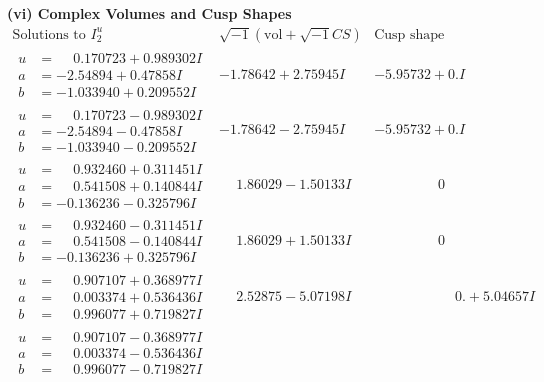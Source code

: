 \documentclass[1p]{elsarticle_modified}
\theoremstyle{definition}
\newcommand{\I}{\sqrt{-1}}
\begin{document}
\newpage\flushleft \textbf{(vi) Complex Volumes and Cusp Shapes}
$$\begin{array}{c|c|c}  
\text{Solutions to }I^u_{2}& \I (\text{vol} + \sqrt{-1}CS) & \text{Cusp shape}\\
 \hline 
\begin{aligned}
u &= \phantom{-}0.170723 + 0.989302 I \\
a &= -2.54894 + 0.47858 I \\
b &= -1.033940 + 0.209552 I\end{aligned}
 & -1.78642 + 2.75945 I & -5.95732 + 0. I\phantom{ +0.000000I} \\ \hline\begin{aligned}
u &= \phantom{-}0.170723 - 0.989302 I \\
a &= -2.54894 - 0.47858 I \\
b &= -1.033940 - 0.209552 I\end{aligned}
 & -1.78642 - 2.75945 I & -5.95732 + 0. I\phantom{ +0.000000I} \\ \hline\begin{aligned}
u &= \phantom{-}0.932460 + 0.311451 I \\
a &= \phantom{-}0.541508 + 0.140844 I \\
b &= -0.136236 - 0.325796 I\end{aligned}
 & \phantom{-}1.86029 - 1.50133 I & \phantom{-0.000000 } 0 \\ \hline\begin{aligned}
u &= \phantom{-}0.932460 - 0.311451 I \\
a &= \phantom{-}0.541508 - 0.140844 I \\
b &= -0.136236 + 0.325796 I\end{aligned}
 & \phantom{-}1.86029 + 1.50133 I & \phantom{-0.000000 } 0 \\ \hline\begin{aligned}
u &= \phantom{-}0.907107 + 0.368977 I \\
a &= \phantom{-}0.003374 + 0.536436 I \\
b &= \phantom{-}0.996077 + 0.719827 I\end{aligned}
 & \phantom{-}2.52875 - 5.07198 I & \phantom{-0.000000 -}0. + 5.04657 I \\ \hline\begin{aligned}
u &= \phantom{-}0.907107 - 0.368977 I \\
a &= \phantom{-}0.003374 - 0.536436 I \\
b &= \phantom{-}0.996077 - 0.719827 I\end{aligned}

\end{array}$$
\end{document}
